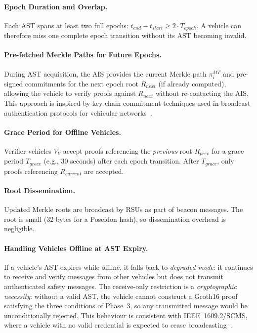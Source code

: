 \paragraph{Epoch Duration and Overlap.}
Each AST spans at least two full epochs: $t_{end} - t_{start} \geq 2 \cdot T_{epoch}$.
A vehicle can therefore miss one complete epoch transition without its AST becoming
invalid.

\paragraph{Pre-fetched Merkle Paths for Future Epochs.}
During AST acquisition, the AIS provides the current Merkle path $\pi^{MT}_i$ and
pre-signed commitments for the next epoch root $R_{next}$ (if already computed),
allowing the vehicle to verify proofs against $R_{next}$ without re-contacting the
AIS. This approach is inspired by key chain commitment techniques used in broadcast
authentication protocols for vehicular networks~\cite{muhammad2024}.

\paragraph{Grace Period for Offline Vehicles.}
Verifier vehicles $V_V$ accept proofs referencing the \emph{previous} root $R_{prev}$
for a grace period $T_{grace}$ (e.g., 30 seconds) after each epoch transition.
After $T_{grace}$, only proofs referencing $R_{current}$ are accepted.

\paragraph{Root Dissemination.}
Updated Merkle roots are broadcast by RSUs as part of beacon messages. The root is
small (32 bytes for a Poseidon hash), so dissemination overhead is negligible.

\paragraph{Handling Vehicles Offline at AST Expiry.}
If a vehicle's AST expires while offline, it falls back to \emph{degraded mode}:
it continues to receive and verify messages from other vehicles but does not transmit
authenticated safety messages. The receive-only restriction is a \emph{cryptographic
necessity}: without a valid AST, the vehicle cannot construct a Groth16 proof
satisfying the three conditions of Phase~3, so any transmitted message would be
unconditionally rejected. This behaviour is consistent with IEEE~1609.2/SCMS, where
a vehicle with no valid credential is expected to cease broadcasting~\cite{ieee1609}.

